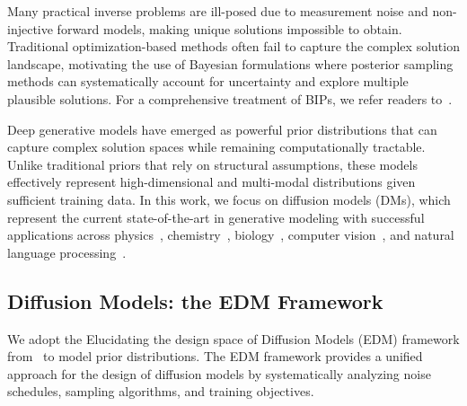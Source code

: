 \documentclass{article}
\numberwithin{equation}{section}
\begin{document}
Many practical inverse problems are ill-posed due to measurement noise and non-injective forward models, making unique solutions impossible to obtain. Traditional optimization-based methods often fail to capture the complex solution landscape, motivating the use of Bayesian formulations where posterior sampling methods can systematically account for uncertainty and explore multiple plausible solutions. For a comprehensive treatment of BIPs, we refer readers to~\cite{stuart2010inverse}.

Deep generative models have emerged as powerful prior distributions that can capture complex solution spaces while remaining computationally tractable. Unlike traditional priors that rely on structural assumptions, these models effectively represent high-dimensional and multi-modal distributions given sufficient training data. In this work, we focus on diffusion models (DMs), which represent the current state-of-the-art in generative modeling with successful applications across physics~\cite{cotler2023renormalizing,habibi2024diffusion,zhu2024quantum}, chemistry~\cite{xu2022geodiff,alakhdar2024diffusion,riesel2024crystal}, biology~\cite{alamdari2023protein,watson2023novo}, computer vision~\cite{rombach2022high,chan2024tutorial}, and natural language processing~\cite{li2022diffusion}.

\subsection{Diffusion Models: the EDM Framework}
\label{subsec: EDM framework}

We adopt the Elucidating the design space of Diffusion Models (EDM) framework from~\cite{karras2022elucidating} to model prior distributions. The EDM framework provides a unified approach for the design of diffusion models by systematically analyzing noise schedules, sampling algorithms, and training objectives. 
\end{document}
